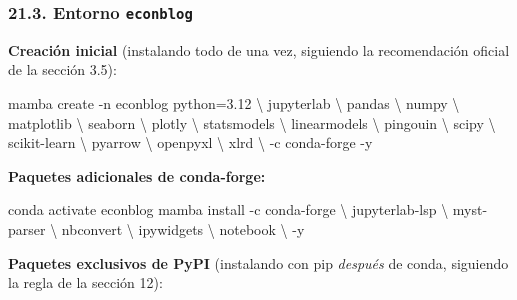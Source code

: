 \documentclass[
  doc,
  floatsintext,
  longtable,
  a4paper,
  nolmodern,
  notxfonts,
  notimes,
  12pt,
  colorlinks=true,linkcolor=blue,citecolor=blue,urlcolor=blue]{apa7}
\newenvironment{Shaded}{\begin{snugshade}}{\end{snugshade}}
\newcommand{\AttributeTok}[1]{\textcolor[rgb]{0.40,0.45,0.13}{#1}}
\newcommand{\DataTypeTok}[1]{\textcolor[rgb]{0.68,0.00,0.00}{#1}}
\newcommand{\ExtensionTok}[1]{\textcolor[rgb]{0.00,0.23,0.31}{#1}}
\newcommand{\NormalTok}[1]{\textcolor[rgb]{0.00,0.23,0.31}{#1}}
\begin{document}
\subsubsection{\texorpdfstring{21.3. Entorno
\texttt{econblog}}{21.3. Entorno econblog}}\label{entorno-econblog}

\textbf{Creación inicial} (instalando todo de una vez, siguiendo la
recomendación oficial de la sección 3.5):

\begin{Shaded}
\begin{Highlighting}[]
\ExtensionTok{mamba}\NormalTok{ create }\AttributeTok{{-}n}\NormalTok{ econblog python=3.12 }\DataTypeTok{\textbackslash{}}
\NormalTok{  jupyterlab }\DataTypeTok{\textbackslash{}}
\NormalTok{  pandas }\DataTypeTok{\textbackslash{}}
\NormalTok{  numpy }\DataTypeTok{\textbackslash{}}
\NormalTok{  matplotlib }\DataTypeTok{\textbackslash{}}
\NormalTok{  seaborn }\DataTypeTok{\textbackslash{}}
\NormalTok{  plotly }\DataTypeTok{\textbackslash{}}
\NormalTok{  statsmodels }\DataTypeTok{\textbackslash{}}
\NormalTok{  linearmodels }\DataTypeTok{\textbackslash{}}
\NormalTok{  pingouin }\DataTypeTok{\textbackslash{}}
\NormalTok{  scipy }\DataTypeTok{\textbackslash{}}
\NormalTok{  scikit{-}learn }\DataTypeTok{\textbackslash{}}
\NormalTok{  pyarrow }\DataTypeTok{\textbackslash{}}
\NormalTok{  openpyxl }\DataTypeTok{\textbackslash{}}
\NormalTok{  xlrd }\DataTypeTok{\textbackslash{}}
  \AttributeTok{{-}c}\NormalTok{ conda{-}forge }\AttributeTok{{-}y}
\end{Highlighting}
\end{Shaded}

\textbf{Paquetes adicionales de conda-forge:}

\begin{Shaded}
\begin{Highlighting}[]
\ExtensionTok{conda}\NormalTok{ activate econblog}
\ExtensionTok{mamba}\NormalTok{ install }\AttributeTok{{-}c}\NormalTok{ conda{-}forge }\DataTypeTok{\textbackslash{}}
\NormalTok{  jupyterlab{-}lsp }\DataTypeTok{\textbackslash{}}
\NormalTok{  myst{-}parser }\DataTypeTok{\textbackslash{}}
\NormalTok{  nbconvert }\DataTypeTok{\textbackslash{}}
\NormalTok{  ipywidgets }\DataTypeTok{\textbackslash{}}
\NormalTok{  notebook }\DataTypeTok{\textbackslash{}}
  \AttributeTok{{-}y}
\end{Highlighting}
\end{Shaded}

\textbf{Paquetes exclusivos de PyPI} (instalando con pip \emph{después}
de conda, siguiendo la regla de la sección 12):
\end{document}
